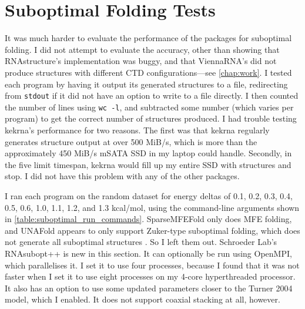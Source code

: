 \documentclass{cshonours}
\begin{document}
\section{Suboptimal Folding Tests}
It was much harder to evaluate the performance of the packages for suboptimal folding. I did not attempt to evaluate the accuracy, other than showing that RNAstructure's implementation was buggy, and that ViennaRNA's did not produce structures with different CTD configurations---see \autoref{chap:work}. I tested each program by having it output its generated structures to a file, redirecting from \texttt{stdout} if it did not have an option to write to a file directly. I then counted the number of lines using \texttt{wc -l}, and subtracted some number (which varies per program) to get the correct number of structures produced. I had trouble testing kekrna's performance for two reasons. The first was that kekrna regularly generates structure output at over 500 MiB/s, which is more than the approximately 450 MiB/s mSATA SSD in my laptop could handle. Secondly, in the five limit timespan, kekrna would fill up my entire SSD with structures and stop. I did not have this problem with any of the other packages.

I ran each program on the random dataset for energy deltas of 0.1, 0.2, 0.3, 0.4, 0.5, 0.6, 1.0, 1.1, 1.2, and 1.3 
kcal/mol, using the command-line arguments shown in \autoref{table:suboptimal_run_commands}. SparseMFEFold only does MFE folding, and UNAFold appears to only support Zuker-type suboptimal folding, which does not generate all suboptimal structures \cite{zukerSuboptimal}. So I left them out. Schroeder Lab's RNAsubopt++ is new in this section. It can optionally be run using OpenMPI, which parallelises it. I set it to use four processes, because I found that it was not faster when I set it to use eight processes on my 4-core hyperthreaded processor. It also has an option to use some updated parameters closer to the Turner 2004 model, which I enabled. It does not support coaxial stacking at all, however.
\end{document}
